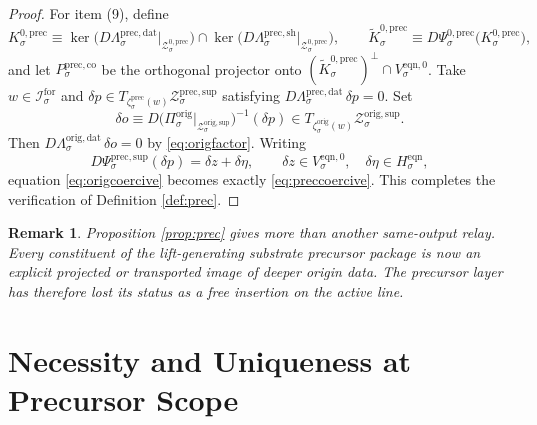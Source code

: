 \documentclass[11pt]{article}
\newcommand{\ForSpace}[1]{\mathcal I_{#1}^{\mathrm{for}}}
\newcommand{\EqnHidden}[1]{H_{#1}^{\mathrm{eqn}}}
\newcommand{\EqnZero}[1]{V_{#1}^{\mathrm{eqn},0}}
\newcommand{\PrecData}[1]{\Lambda_{#1}^{\mathrm{prec,dat}}}
\newcommand{\PrecShellMap}[1]{\Lambda_{#1}^{\mathrm{prec,sh}}}
\newcommand{\PrecSupportShell}[1]{\mathcal Z_{#1}^{\mathrm{prec,sup}}}
\newcommand{\PrecZeroCore}[1]{\mathcal Z_{#1}^{0,\mathrm{prec}}}
\newcommand{\PrecEqChart}[1]{\Psi_{#1}^{\mathrm{prec,sup}}}
\newcommand{\PrecZeroChart}[1]{\Psi_{#1}^{0,\mathrm{prec}}}
\newcommand{\PrecEmbed}[1]{\zeta_{#1}^{\mathrm{prec}}}
\newcommand{\PrecKernel}[1]{K_{#1}^{0,\mathrm{prec}}}
\newcommand{\PrecKernelCh}[1]{\widetilde K_{#1}^{0,\mathrm{prec}}}
\newcommand{\PrecStateComp}[1]{P_{#1}^{\mathrm{prec,co}}}
\newcommand{\OrigProj}[1]{\Pi_{#1}^{\mathrm{orig}}}
\newcommand{\OrigData}[1]{\Lambda_{#1}^{\mathrm{orig,dat}}}
\newcommand{\OrigSupportShell}[1]{\mathcal Z_{#1}^{\mathrm{orig,sup}}}
\newcommand{\OrigEmbed}[1]{\zeta_{#1}^{\mathrm{orig}}}
\newtheorem{remark}{Remark}
\begin{document}
\begin{proof}
For item (9), define
\[
\PrecKernel{\sigma}
\equiv
\ker\bigl(D\PrecData{\sigma}\big|_{\PrecZeroCore{\sigma}}\bigr)
\cap
\ker\bigl(D\PrecShellMap{\sigma}\big|_{\PrecZeroCore{\sigma}}\bigr),
\qquad
\PrecKernelCh{\sigma}
\equiv
D\PrecZeroChart{\sigma}\bigl(\PrecKernel{\sigma}\bigr),
\]
and let \(\PrecStateComp{\sigma}\) be the orthogonal projector onto \((\PrecKernelCh{\sigma})^{\perp}\cap\EqnZero{\sigma}\). Take \(w\in\ForSpace{\sigma}\) and \(\delta p\in T_{\PrecEmbed{\sigma}(w)}\PrecSupportShell{\sigma}\) satisfying \(D\PrecData{\sigma}\,\delta p=0\). Set
\[
\delta o
\equiv
D\bigl(\OrigProj{\sigma}\big|_{\OrigSupportShell{\sigma}}\bigr)^{-1}(\delta p)
\in
T_{\OrigEmbed{\sigma}(w)}\OrigSupportShell{\sigma}.
\]
Then \(D\OrigData{\sigma}\,\delta o=0\) by \eqref{eq:origfactor}. Writing
\[
D\PrecEqChart{\sigma}(\delta p)=\delta z+\delta\eta,
\qquad
\delta z\in\EqnZero{\sigma},
\quad
\delta\eta\in\EqnHidden{\sigma},
\]
equation \eqref{eq:origcoercive} becomes exactly \eqref{eq:preccoercive}. This completes the verification of Definition \ref{def:prec}.
\end{proof}

\begin{remark}
Proposition \ref{prop:prec} gives more than another same-output relay. Every constituent of the lift-generating substrate precursor package is now an explicit projected or transported image of deeper origin data. The precursor layer has therefore lost its status as a free insertion on the active line.
\end{remark}

\section{Necessity and Uniqueness at Precursor Scope}
\end{document}
